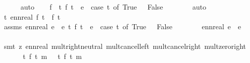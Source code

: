 \begin{isabellebody}
\ \ \ \ \isamarkupfalse%
\ auto\isanewline
\ \ \isamarkupfalse%
\ f{}\ \ {\isachardoublequoteopen}{\isasymAnd}t{\isachardot}{\kern0pt}\ f{}\ t\ {\isacharequal}{\kern0pt}\ e{}\ {\isacharasterisk}{\kern0pt}\ {\isacharparenleft}{\kern0pt}case\ t\ of\ True\ {\isasymRightarrow}\ {}{\isacharbar}{\kern0pt}\ False\ {\isasymRightarrow}\ {}{\isacharparenright}{\kern0pt}{\isachardoublequoteclose}\isanewline
\ \ \ \ \isamarkupfalse%
\ auto\isanewline
\ \ \isamarkupfalse%
\ \isamarkupfalse%
\ {\isachardoublequoteopen}{\isasymAnd}t{\isachardot}{\kern0pt}\ ennreal\ {\isacharparenleft}{\kern0pt}f{}\ t{\isacharparenright}{\kern0pt}\ {\isacharequal}{\kern0pt}\ f\ t{\isachardoublequoteclose}\isanewline
\ \ \ \ \isamarkupfalse%
\ assms{\isacharparenleft}{\kern0pt}{}{\isacharparenright}{\kern0pt}\ {\isacartoucheopen}ennreal\ e{}\ {\isacharequal}{\kern0pt}\ e{\isacartoucheclose}\ {\isacartoucheopen}{\isasymAnd}t{\isachardot}{\kern0pt}\ f{}\ t\ {\isacharequal}{\kern0pt}\ e{}\ {\isacharasterisk}{\kern0pt}\ {\isacharparenleft}{\kern0pt}case\ t\ of\ True\ {\isasymRightarrow}\ {}{\isacharbar}{\kern0pt}\ False\ {\isasymRightarrow}\ {}{\isacharparenright}{\kern0pt}{\isacartoucheclose}\isanewline
\ \ \ \ \isamarkupfalse%
\ {\isacartoucheopen}ennreal\ e{}\ {\isacharequal}{\kern0pt}\ e{\isacartoucheclose}\isanewline
\ \ \ \ \isamarkupfalse%
\ {\isacharparenleft}{\kern0pt}smt\ {\isacharparenleft}{\kern0pt}z{}{\isacharparenright}{\kern0pt}\ ennreal{\isacharunderscore}{\kern0pt}{}\ mult{\isachardot}{\kern0pt}right{\isacharunderscore}{\kern0pt}neutral\ mult{\isacharunderscore}{\kern0pt}cancel{\isacharunderscore}{\kern0pt}left{}\ mult{\isacharunderscore}{\kern0pt}cancel{\isacharunderscore}{\kern0pt}right{}\ mult{\isacharunderscore}{\kern0pt}zero{\isacharunderscore}{\kern0pt}right{\isacharparenright}{\kern0pt}\isanewline
\ \ \isamarkupfalse%
\ \isamarkupfalse%
\ {\isachardoublequoteopen}{\isacharparenleft}{\kern0pt}{\isasymintegral}\isactrlsup {\isacharplus}{\kern0pt}\ t{\isachardot}{\kern0pt}\ {\isacharparenleft}{\kern0pt}f{}\ t{\isacharparenright}{\kern0pt}\ {\isasympartial}m{\isacharparenright}{\kern0pt}\ {\isacharequal}{\kern0pt}\ {\isasymintegral}\isactrlsup {\isacharplus}{\kern0pt}\ t{\isachardot}{\kern0pt}\ {\isacharparenleft}{\kern0pt}f\ t{\isacharparenright}{\kern0pt}\ {\isasympartial}m{\isachardoublequoteclose}\isanewline

\end{isabellebody}
